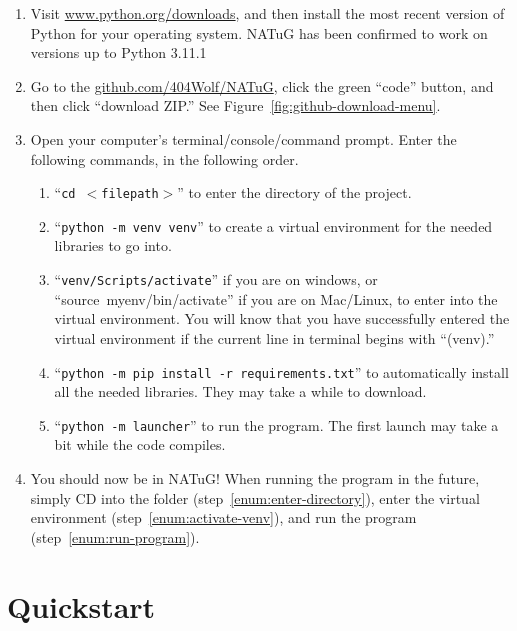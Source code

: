 \documentclass[titlepage]{article}
\begin{document}
	\begin{enumerate} \label{sect:getting-natug-running}
		\item Visit \href{Python's download page}{www.python.org/downloads}, and then install the most recent version of Python for your operating system. NATuG has been confirmed to work on versions up to Python 3.11.1
		\item Go to the \href{NATuG’s Github page}{github.com/404Wolf/NATuG}, click the green ``code'' button, and then click ``download ZIP.'' See Figure~\ref{fig:github-download-menu}.
		\item Open your computer's terminal/console/command prompt. Enter the following commands, in the following order. 
		
		\begin{enumerate}
			\item ``\texttt{cd $<$filepath$>$}'' to enter the directory of the project. \label{enum:enter-directory}
			
			\item ``\texttt{python~-m~venv~venv}'' to create a virtual environment for the needed libraries to go into.
			
			\item ``\texttt{venv/Scripts/activate}'' if you are on windows, or ``source~myenv/bin/activate'' if you are on Mac/Linux, to enter into the virtual environment. You will know that you have successfully entered the virtual environment if the current line in terminal begins with ``(venv).'' \label{enum:activate-venv}
			
			\item ``\texttt{python -m pip install -r requirements.txt}'' to automatically install all the needed libraries. They may take a while to download.
			
			\item ``\texttt{python -m launcher}'' to run the program. The first launch may take a bit while the code compiles. \label{enum:run-program}
		\end{enumerate}
	
		\item You should now be in NATuG! When running the program in the future, simply CD into the folder (step~\ref{enum:enter-directory}), enter the virtual environment (step~\ref{enum:activate-venv}), and run the program (step~\ref{enum:run-program}).
	\end{enumerate}

\section{Quickstart}
\end{document}
